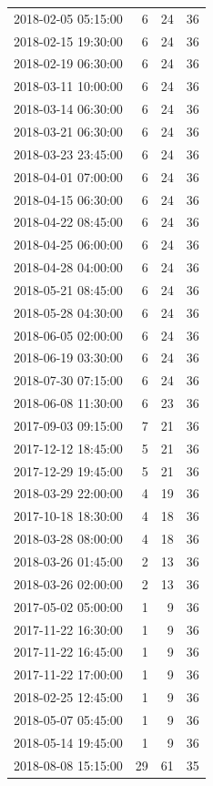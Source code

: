 \begin{tabular}{lrrr}
2018-02-05 05:15:00 & 6 & 24 & 36 \\
2018-02-15 19:30:00 & 6 & 24 & 36 \\
2018-02-19 06:30:00 & 6 & 24 & 36 \\
2018-03-11 10:00:00 & 6 & 24 & 36 \\
2018-03-14 06:30:00 & 6 & 24 & 36 \\
2018-03-21 06:30:00 & 6 & 24 & 36 \\
2018-03-23 23:45:00 & 6 & 24 & 36 \\
2018-04-01 07:00:00 & 6 & 24 & 36 \\
2018-04-15 06:30:00 & 6 & 24 & 36 \\
2018-04-22 08:45:00 & 6 & 24 & 36 \\
2018-04-25 06:00:00 & 6 & 24 & 36 \\
2018-04-28 04:00:00 & 6 & 24 & 36 \\
2018-05-21 08:45:00 & 6 & 24 & 36 \\
2018-05-28 04:30:00 & 6 & 24 & 36 \\
2018-06-05 02:00:00 & 6 & 24 & 36 \\
2018-06-19 03:30:00 & 6 & 24 & 36 \\
2018-07-30 07:15:00 & 6 & 24 & 36 \\
2018-06-08 11:30:00 & 6 & 23 & 36 \\
2017-09-03 09:15:00 & 7 & 21 & 36 \\
2017-12-12 18:45:00 & 5 & 21 & 36 \\
2017-12-29 19:45:00 & 5 & 21 & 36 \\
2018-03-29 22:00:00 & 4 & 19 & 36 \\
2017-10-18 18:30:00 & 4 & 18 & 36 \\
2018-03-28 08:00:00 & 4 & 18 & 36 \\
2018-03-26 01:45:00 & 2 & 13 & 36 \\
2018-03-26 02:00:00 & 2 & 13 & 36 \\
2017-05-02 05:00:00 & 1 & 9 & 36 \\
2017-11-22 16:30:00 & 1 & 9 & 36 \\
2017-11-22 16:45:00 & 1 & 9 & 36 \\
2017-11-22 17:00:00 & 1 & 9 & 36 \\
2018-02-25 12:45:00 & 1 & 9 & 36 \\
2018-05-07 05:45:00 & 1 & 9 & 36 \\
2018-05-14 19:45:00 & 1 & 9 & 36 \\
2018-08-08 15:15:00 & 29 & 61 & 35 \\

\end{tabular}
